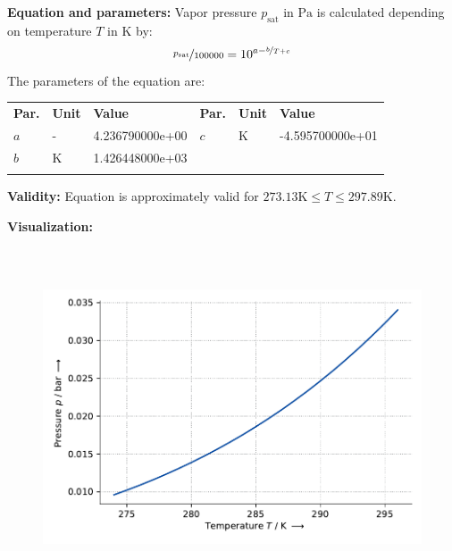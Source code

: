 \textbf{Equation and parameters:}
\newline
%
Vapor pressure $p_\mathrm{sat}$ in $\si{\pascal}$ is calculated depending on temperature $T$ in $\si{\kelvin}$ by:
%
\begin{equation*}
\nicefrac{p_\mathrm{sat}}{100000} = 10^{a - \nicefrac{b}{T + c}}
\end{equation*}
%
The parameters of the equation are:
%
\begin{longtable}[l]{lll|lll}
\toprule
\addlinespace
\textbf{Par.} & \textbf{Unit} & \textbf{Value} &	\textbf{Par.} & \textbf{Unit} & \textbf{Value} \\
\addlinespace
\midrule
\endhead

\bottomrule
\endfoot
\bottomrule
\endlastfoot
\addlinespace

$a$ & - & 4.236790000e+00 & $c$ & $\si{\kelvin}$  & -4.595700000e+01 \\
$b$ & $\si{\kelvin}$ & 1.426448000e+03 & & & \\

\addlinespace\end{longtable}

\textbf{Validity:}
\newline
Equation is approximately valid for $273.13 \si{\kelvin} \leq T \leq 297.89 \si{\kelvin}$.
\newline

\textbf{Visualization:}
%
\begin{figure}[!htp]
{\noindent\includegraphics[height=10cm, keepaspectratio]{figs/ref/ref_Toluene_VaporPressure_Antoine_1.pdf}}
\end{figure}
%

